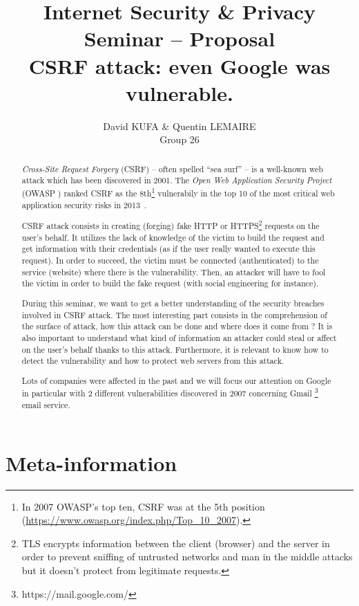 \documentclass[a4paper,11pt]{article}
\title{Internet Security \& Privacy\\Seminar -- Proposal\\\vspace{10pt}\textbf{CSRF attack: even Google was vulnerable.}}
\author{David KUFA \& Quentin LEMAIRE\\Group 26}
\newcommand{\csrf}{\textit{Cross-Site Request Forgery}}
\begin{document}
  \maketitle %

  \begin{abstract}
  \csrf{} (CSRF) -- often spelled ``sea surf'' -- is a well-known web attack which has 
  been discovered in 2001. The \textit{Open Web Application Security Project} (OWASP \cite{owasp}) 
  ranked CSRF as the 8th\footnote{In 2007 OWASP's top ten, CSRF was at the 5th position 
  (\url{https://www.owasp.org/index.php/Top_10_2007}).} vulnerabily in the top 10 of the 
  most critical web application security risks in 2013~\cite{owasp_top_ten}.
  
  CSRF attack consists in creating (forging) fake HTTP or HTTPS\footnote{TLS encrypts 
  information between the client (browser) and the server in order to prevent sniffing 
  of untrusted networks and man in the middle attacks but it doesn't protect from 
  legitimate requests.} requests on the user's behalf. It utilizes the lack of knowledge 
  of the victim to build the request and get information with their credentials (as if 
  the user really wanted to execute this request). In order to succeed, the victim must 
  be connected (authenticated) to the service (website) where there is the vulnerability. 
  Then, an attacker will have to fool the victim in order to build the fake request (with 
  social engineering for instance).
  
  During this seminar, we want to get a better understanding of the security breaches 
  involved in CSRF attack. The most interesting part consists in the comprehension of 
  the surface of attack, how this attack can be done and where does it come from ? It 
  is also important to understand what kind of information an attacker could steal or 
  affect on the user's behalf thanks to this attack. Furthermore, it is relevant to 
  know how to detect the vulnerability and how to protect web servers from this attack.
  
  Lots of companies were affected in the past and we will focus our attention on Google 
  in particular with 2 different vulnerabilities discovered in 2007 concerning Gmail
  \footnote{https://mail.google.com/} email service.
  \end{abstract}


  \section{Meta-information}
  
\end{document}
